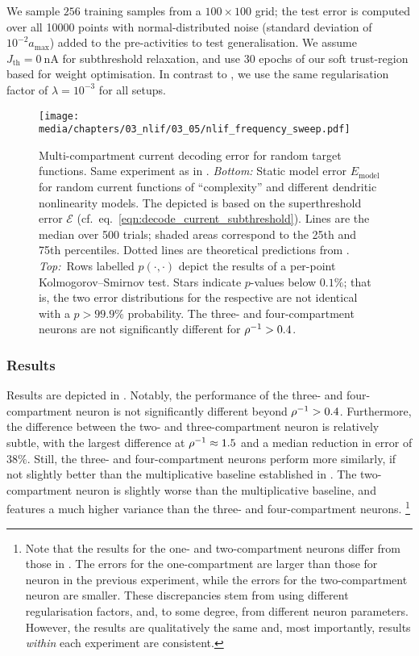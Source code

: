 We sample $256$ training samples from a $100 \times 100$ grid; the test error is computed over all \num{10000} points with normal-distributed noise (standard deviation of $10^{-2} a_\mathrm{max}$) added to the pre-activities to test generalisation.
We assume $J_\mathrm{th} = \SI{0}{\nano\ampere}$ for subthreshold relaxation, and use $30$ epochs of our soft trust-region based \SQP for weight optimisation.
In contrast to , we use the same regularisation factor of $\lambda = 10^{-3}$ for all setups.

\begin{figure}
	\centering
	\texttt{[image: media/chapters/03\_nlif/03\_05/nlif\_frequency\_sweep.pdf]}
	\caption[Multi-compartment current decoding error for random target functions]{Multi-compartment current decoding error for random target functions. Same experiment as in .
	\emph{Bottom:}
	Static model error $E_\mathrm{model}$ for random current functions of \enquote{complexity} \slc and different \nlif dendritic nonlinearity models.
	The depicted \NRMSE is based on the superthreshold error $\mathcal{E}$ (cf.~eq.~\ref{eqn:decode_current_subthreshold}).
	Lines are the median over \num{500} trials; shaded areas correspond to the 25th and 75th percentiles.
	Dotted lines are theoretical predictions from .
	\emph{Top:}~Rows labelled $p(\cdot, \cdot)$ depict the results of a per-point Kolmogorov–Smirnov test.
	Stars indicate $p$-values below $0.1\%$; that is, the two error distributions for the respective \slc are not identical with a $p > 99.9\%$ probability.
	The three- and four-compartment neurons are not significantly different for ${\rho^{-1}} > 0.4$.
	}
	\label{fig:nlif_frequency_sweep}
\end{figure}

\subsubsection{Results}
Results are depicted in .
Notably, the performance of the three- and four-compartment neuron is not significantly different beyond ${\rho^{-1}} > 0.4$.
Furthermore, the difference between the two- and three-compartment neuron is relatively subtle, with the largest difference at ${\rho^{-1}} \approx 1.5$ and a median reduction in error of $38\%$.
Still, the three- and four-compartment neurons perform more similarly, if not slightly better than the multiplicative baseline established in .
The two-compartment neuron is slightly worse than the multiplicative baseline, and features a much higher variance than the three- and four-compartment neurons.%
\footnote{Note that the results for the one- and two-compartment neurons differ from those in .
The errors for the one-compartment are larger than those for \LIF neuron in the previous experiment, while the errors for the two-compartment neuron are smaller.
These discrepancies stem from using different regularisation factors, and, to some degree, from different neuron parameters.
However, the results are qualitatively the same and, most importantly, results \emph{within} each experiment are consistent.}

